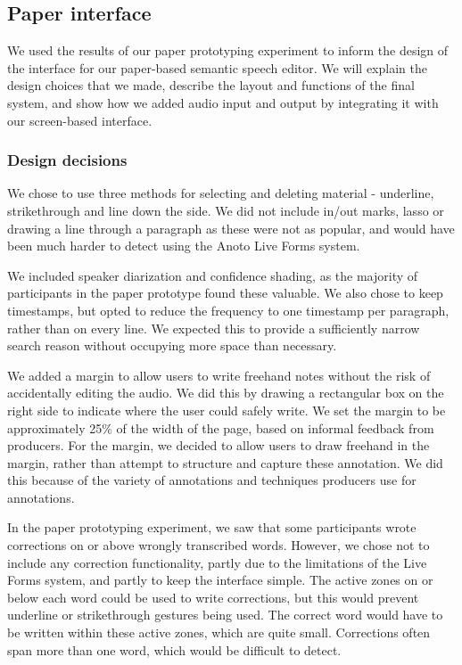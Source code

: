 \subsection{Paper interface}

We used the results of our paper prototyping experiment to inform the design of the interface for our paper-based
semantic speech editor. We will explain the design choices that we made, describe the layout and functions of the final
system, and show how we added audio input and output by integrating it with our screen-based interface.

\subsubsection{Design decisions}

We chose to use three methods for selecting and deleting material - underline, strikethrough and line down the side.
We did not include in/out marks, lasso or drawing a line through a paragraph as these were not as popular, and would
have been much harder to detect using the Anoto Live Forms system.

We included speaker diarization and confidence shading, as the majority of participants in the paper prototype found
these valuable. We also chose to keep timestamps, but opted to reduce the frequency to one timestamp per paragraph,
rather than on every line. We expected this to provide a sufficiently narrow search reason without occupying more space
than necessary.

We added a margin to allow users to write freehand notes without the risk of accidentally editing the audio. We did
this by drawing a rectangular box on the right side to indicate where the user could safely write.
We set the margin to be approximately 25\% of the width of the page, based on informal feedback from producers.
For the margin, we decided to allow users to draw freehand in the margin, rather than attempt to structure and capture
these annotation. We did this because of the variety of annotations and techniques producers use for annotations.

In the paper prototyping experiment, we saw that some participants wrote corrections on or above wrongly transcribed
words. However, we chose not to include any correction functionality, partly due to the limitations of the Live Forms
system, and partly to keep the interface simple. The active zones on or below each word could be used to write
corrections, but this would prevent underline or strikethrough gestures being used. The correct word would have to be
written within these active zones, which are quite small. Corrections often span more than one word, which would be
difficult to detect.

